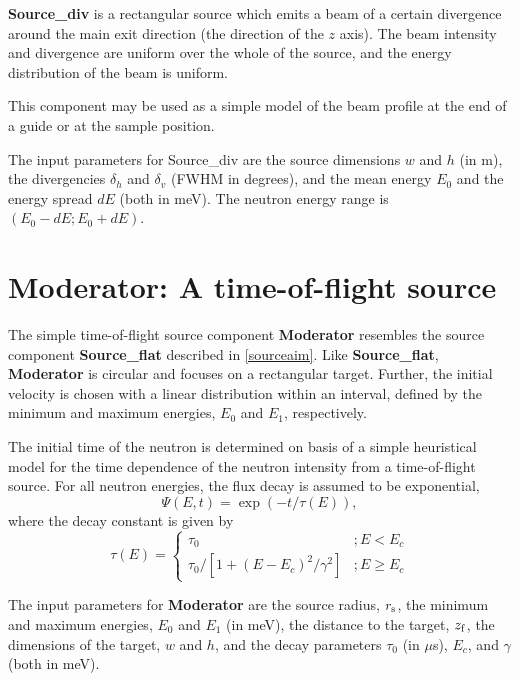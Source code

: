 {\bf Source\_div} is a rectangular source which emits a
beam of a certain divergence around the main exit direction
(the direction of the $z$ axis).
The beam intensity and divergence are uniform over
the whole of the source, and the energy distribution
of the beam is uniform.

This component may be used as a simple model of the
beam profile at the end of a guide or at the sample
position.

The input parameters for Source\_div are the source dimensions
$w$ and $h$ (in m), the divergencies $\delta_h$ and $\delta_v$ (FWHM in degrees), 
and the mean energy $E_0$ and the energy spread $dE$ (both in meV).
The neutron energy range is $(E_0-dE; E_0+dE)$. 


\section{Moderator: A time-of-flight source}
The simple time-of-flight source component {\bf Moderator} resembles
the source component {\bf Source\_flat} described in \ref{sourceaim}.
Like {\bf Source\_flat}, {\bf Moderator} is circular and focuses
on a rectangular target. Further, the initial velocity is chosen
with a linear distribution within an interval, defined by the
minimum and maximum energies, $E_0$ and $E_1$,
respectively.

The initial time of the neutron is determined on basis of a 
simple heuristical model for the time dependence of the 
neutron intensity from a time-of-flight source.
For all neutron energies, the flux decay is assumed to be exponential,
\begin{equation}
\Psi(E,t) = \exp(-t/\tau(E)) ,
\end{equation}
where the decay constant is given by
\begin{equation}
\tau(E) = \left\{ 
\begin{array}{cc}
 \tau_0                               & ; E<E_c \\
 \tau_0 / [ 1 + (E-E_c)^2/\gamma^2 ]  & ; E \geq E_c
\end{array}
\right.
\end{equation}

The input parameters for {\bf Moderator} are the source radius, $r_{\rm s}$,
the minimum and maximum energies, $E_0$ and $E_1$ (in meV),
the distance to the target, $z_{\rm f}$, the dimensions of the target,
$w$ and $h$, and the decay parameters 
$\tau_0$ (in $\mu$s), $E_c$, and $\gamma$ (both in meV).





